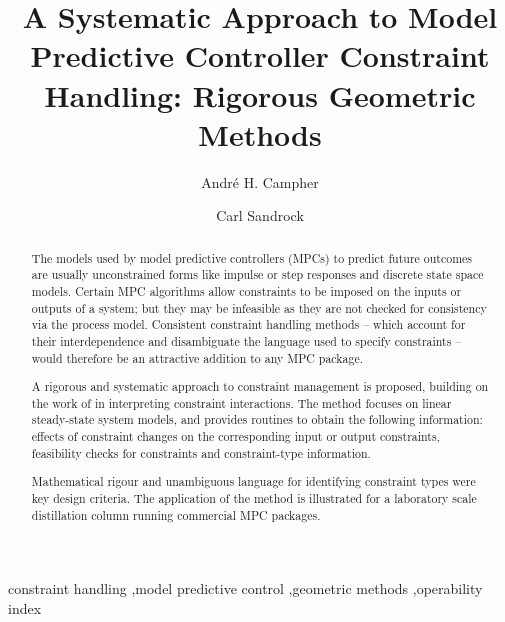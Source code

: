 \documentclass[final,authoryear,5pt,times,twocolumn]{elsarticle}
\begin{document}
\begin{frontmatter}

\title{A Systematic Approach to Model Predictive Controller Constraint Handling: Rigorous Geometric Methods}

\author{Andr\'e H. Campher}

\author{Carl Sandrock}


\address{Department of Chemical Engineering, University of Pretoria, Pretoria, 0001, South Africa}

\begin{abstract}
The models used by model predictive controllers (MPCs) to predict future outcomes are usually unconstrained forms like impulse or step responses and discrete state space models. 
Certain MPC algorithms allow constraints  to be imposed on the inputs or outputs of a system; but they may be infeasible as they are not checked for consistency via the process model. 
Consistent constraint handling methods -- which account for their interdependence and disambiguate the language used to specify constraints -- would therefore be an attractive addition to any MPC package.

A rigorous and systematic approach to constraint management is proposed, building on the work of \citet{vinsonartoi} in interpreting constraint interactions. 
The method focuses on linear steady-state system models, and provides routines to obtain the following information: effects of constraint changes on the corresponding input or output constraints, feasibility checks for constraints and constraint-type information.

Mathematical rigour and unambiguous language for identifying constraint types were key design criteria. 
The application of the method is illustrated for a laboratory scale distillation column running commercial MPC packages.
\end{abstract}

\begin{keyword}
constraint handling \sep model predictive control \sep geometric methods \sep operability index
\end{keyword}

\end{frontmatter}

\end{document}
